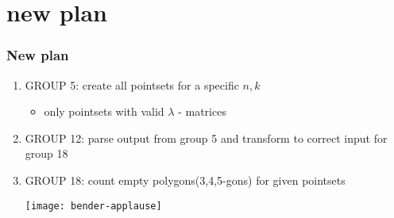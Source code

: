 \documentclass{beamer}
\begin{document}
\section{new plan}
\begin{frame}
\frametitle{New plan}
\begin{enumerate}
\item GROUP 5: create all pointsets for a specific $n,k$
  \begin{itemize}
  \item only pointsets with valid $\lambda$ - matrices
  \end{itemize}
\item GROUP 12: parse output from group 5 and transform to correct input for group 18
\item GROUP 18: count empty polygons(3,4,5-gons) for given pointsets
\begin{center}
\vspace{2em}
\texttt{[image: bender-applause]}
\end{center}



\end{enumerate}
\end{frame}




\end{document}
